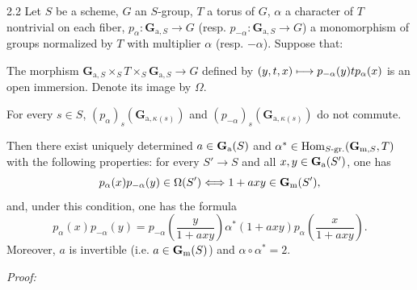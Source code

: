 \begin{proposition}{2.2}\label{XX.2.2}
Let $S$ be a scheme, $G$ an $S$-group, $T$ a torus of $G$, $\alpha$ a character of $T$ nontrivial on each fiber, $p_\alpha:\mathbf G_{\mathrm a,S}\to G$ (resp. $p_{-\alpha}:\mathbf G_{\mathrm a,S}\to G$) a monomorphism of groups normalized by $T$ with multiplier $\alpha$ (resp. $-\alpha$). Suppose that:
\begin{enumeratei}
\item The morphism $\mathbf G_{\mathrm a,S}\times_ST\times_S\mathbf G_{\mathrm a,S}\to G$ defined by $(y,t,x)\longmapsto p_{-\alpha}(y)tp_\alpha(x)$ is an open immersion. Denote its image by $\Omega$.
\item For every $s\in S$, $(p_\alpha)_s(\mathbf G_{\mathrm a,\kappa(s)})$ and $(p_{-\alpha})_s(\mathbf G_{\mathrm a,\kappa(s)})$ do not commute.
\end{enumeratei}
Then there exist uniquely determined $a\in\mathbf{G}_{\mathrm{a}}(S)$ and $\alpha^*\in\operatorname{Hom}_{S\text{-gr.}}(\mathbf G_{\mathrm m,S},T)$ with the following properties: for every $S'\to S$ and all $x,y\in\mathbf{G}_{\mathrm{a}}(S')$, one has
\[
p_\alpha(x)p_{-\alpha}(y)\in\Omega(S')\Longleftrightarrow1+axy\in\mathbf{G}_{\mathrm{m}}(S'),
\]
and, under this condition, one has the formula
\[
p_\alpha(x)p_{-\alpha}(y)=p_{-\alpha}\left(\frac{y}{1+axy}\right)\alpha^*(1+axy)p_\alpha\left(\frac{x}{1+axy}\right).
\]
Moreover, $a$ is invertible (i.e. $a\in\mathbf{G}_{\mathrm{m}}(S)$) and $\alpha\circ\alpha^*=2$.
\end{proposition}
\emph{Proof:}

